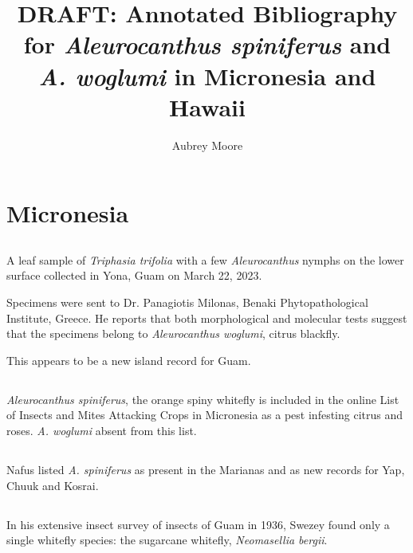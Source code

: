 \documentclass[]{scrartcl}
\title{DRAFT: Annotated Bibliography for \textit{Aleurocanthus spiniferus} and \textit{A. woglumi} in Micronesia and Hawaii}
\author{Aubrey Moore}
\begin{document}
\maketitle

\section{Micronesia}

\subsection{}

A leaf sample of \textit{Triphasia trifolia} with a few \textit{Aleurocanthus} nymphs on the lower surface collected in Yona, Guam on March 22, 2023.
 
Specimens were sent to Dr. Panagiotis Milonas, Benaki Phytopathological Institute, Greece. He reports that both morphological and molecular tests suggest that the specimens belong to \textit{Aleurocanthus woglumi}, citrus blackfly.

This appears to be a new island record for Guam.

\subsection{}

\textit{Aleurocanthus spiniferus}, the orange spiny whitefly is included in the online List of Insects and Mites Attacking Crops in Micronesia as a pest infesting citrus and roses. \textit{A. woglumi} absent from this list.

\subsection{}
	
Nafus listed \textit{A. spiniferus} as present in the Marianas and as new records for Yap, Chuuk and Kosrai.

\subsection{}


In his extensive insect survey of insects of Guam in 1936, Swezey found only a single whitefly species: the sugarcane whitefly, \textit{Neomasellia bergii}.

\subsection{}
\end{document}
